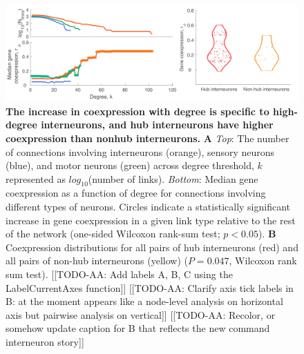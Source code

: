 \documentclass[10pt,letterpaper]{article}
\begin{document}
\begin{figure}[h]
\centering
   \includegraphics[width=1\textwidth]{TypeDegree.pdf}
 \caption{
\textbf{The increase in coexpression with degree is specific to high-degree interneurons, and hub interneurons have higher coexpression than nonhub interneurons.}
\textbf{A} \emph{Top}: The number of connections involving interneurons (orange), sensory neurons (blue), and motor neurons (green) across degree threshold, $k$ represented as $log_{10}$(number of links).
\emph{Bottom}: Median gene coexpression as a function of degree for connections involving different types of neurons. Circles indicate a statistically significant increase in gene coexpression in a given link type relative to the rest of the network (one-sided Wilcoxon rank-sum test;  $p<0.05$).
\textbf{B} Coexpression distributions for all pairs of hub interneurons (red) and all pairs of non-hub interneurons (yellow) ($P = 0.047$, Wilcoxon rank sum test).
[[TODO-AA: Add labels A, B, C using the LabelCurrentAxes function]]
[[TODO-AA: Clarify axis tick labels in B: at the moment appears like a node-level analysis on horizontal axis but pairwise analysis on vertical]]
[[TODO-AA: Recolor, or somehow update caption for B that reflects the new command interneuron story]]
}
 \label{fig:interneuron_dep}
\end{figure}

\end{document}
